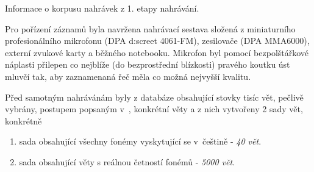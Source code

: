 \begin{table}[htpb]
  \centering
  \def\arraystretch{1.5}
  \caption{Informace o korpusu nahrávek z 1. etapy nahrávání.}
  \label{tab:construction:recording}
\end{table}


Pro pořízení záznamů byla navržena nahrávací sestava složená z miniaturního profesionálního mikrofonu (DPA d:screet 4061-FM), zesilovače (DPA MMA6000), externí zvukové karty a běžného notebooku. Mikrofon byl pomocí bezpolštářkové náplasti přilepen co nejblíže (do bezprostřední blízkosti) pravého koutku úst mluvčí tak, aby zaznamenaná řeč měla co možná nejvyšší kvalitu.


Před samotným nahrávánám byly z databáze obsahující stovky tisíc vět, pečlivě vybrány, postupem popsaným v~\cite{Radova2000}, konkrétní věty a z nich vytvořeny 2 sady vět, konkrétně

\begin{enumerate}
  \item sada obsahující všechny fonémy vyskytující se v~češtině - \textit{40 vět}.
  \item sada obsahující věty s reálnou četností fonémů - \textit{5000 vět}.
\end{enumerate}

